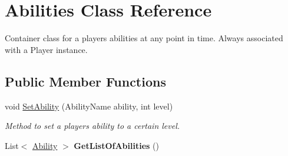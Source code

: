 \hypertarget{class_abilities}{}\section{Abilities Class Reference}
\label{class_abilities}


Container class for a player\textquotesingle{}s abilities at any point in time. Always associated with a Player instance.  


\subsection*{Public Member Functions}
\begin{DoxyCompactItemize}
\item 
void \hyperlink{class_abilities_afcbec74e5bb70d221f0fc0ec8ed53196}{Set\+Ability} (Ability\+Name ability, int level)
\begin{DoxyCompactList}\small\item\em Method to set a player\textquotesingle{}s ability to a certain level. \end{DoxyCompactList}\item 
List$<$ \hyperlink{class_ability}{Ability} $>$ {\bfseries Get\+List\+Of\+Abilities} ()\hypertarget{class_abilities_ad473b84500204ae481b9f3a675610cf0}{}\label{class_abilities_ad473b84500204ae481b9f3a675610cf0}

\end{DoxyCompactItemize}
